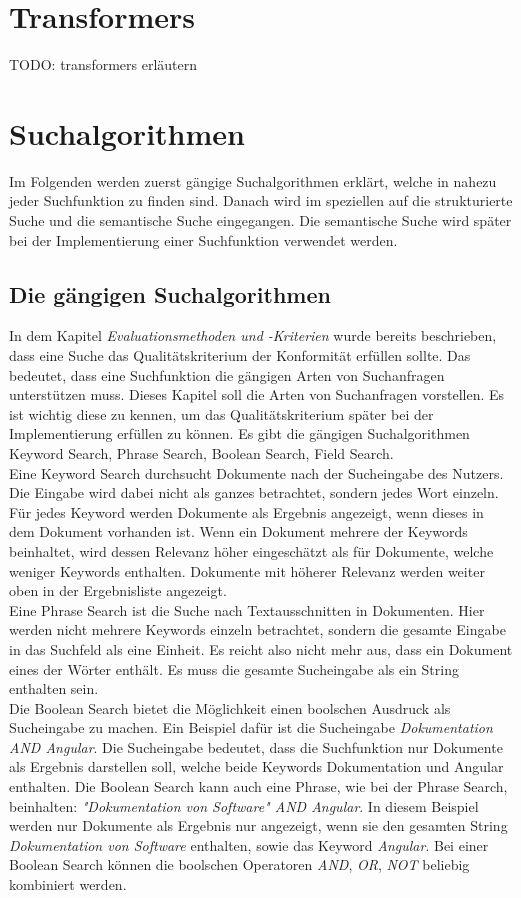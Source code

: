 \section{Transformers}
TODO: transformers erläutern

\section{Suchalgorithmen}
Im Folgenden werden zuerst gängige Suchalgorithmen erklärt, welche in nahezu jeder Suchfunktion zu finden sind.
Danach wird im speziellen auf die strukturierte Suche und die semantische Suche eingegangen.
Die semantische Suche wird später bei der Implementierung einer Suchfunktion verwendet werden.

\subsection{Die gängigen Suchalgorithmen}
In dem Kapitel \textit{Evaluationsmethoden und -Kriterien} wurde bereits beschrieben, dass eine Suche das Qualitätskriterium der Konformität erfüllen sollte.
Das bedeutet, dass eine Suchfunktion die gängigen Arten von Suchanfragen unterstützen muss.
Dieses Kapitel soll die Arten von Suchanfragen vorstellen.
Es ist wichtig diese zu kennen, um das Qualitätskriterium später bei der Implementierung erfüllen zu können.
Es gibt die gängigen Suchalgorithmen Keyword Search, Phrase Search, Boolean Search, Field Search.\\

Eine Keyword Search durchsucht Dokumente nach der Sucheingabe des Nutzers.
Die Eingabe wird dabei nicht als ganzes betrachtet, sondern jedes Wort einzeln.
Für jedes Keyword werden Dokumente als Ergebnis angezeigt, wenn dieses in dem Dokument vorhanden ist.
Wenn ein Dokument mehrere der Keywords beinhaltet, wird dessen Relevanz höher eingeschätzt als für Dokumente, welche weniger Keywords enthalten.
Dokumente mit höherer Relevanz werden weiter oben in der Ergebnisliste angezeigt.\\

Eine Phrase Search ist die Suche nach Textausschnitten in Dokumenten.
Hier werden nicht mehrere Keywords einzeln betrachtet, sondern die gesamte Eingabe in das Suchfeld als eine Einheit.
Es reicht also nicht mehr aus, dass ein Dokument eines der Wörter enthält.
Es muss die gesamte Sucheingabe als ein String enthalten sein.\\

Die Boolean Search bietet die Möglichkeit einen boolschen Ausdruck als Sucheingabe zu machen.
Ein Beispiel dafür ist die Sucheingabe \textit{Dokumentation AND Angular}.
Die Sucheingabe bedeutet, dass die Suchfunktion nur Dokumente als Ergebnis darstellen soll, welche beide Keywords Dokumentation und Angular enthalten.
Die Boolean Search kann auch eine Phrase, wie bei der Phrase Search, beinhalten: \textit{"Dokumentation von Software" AND Angular}.
In diesem Beispiel werden nur Dokumente als Ergebnis nur angezeigt, wenn sie den gesamten String \textit{Dokumentation von Software} enthalten, sowie das Keyword \textit{Angular}.
Bei einer Boolean Search können die boolschen Operatoren \textit{AND}, \textit{OR}, \textit{NOT} beliebig kombiniert werden.\\

